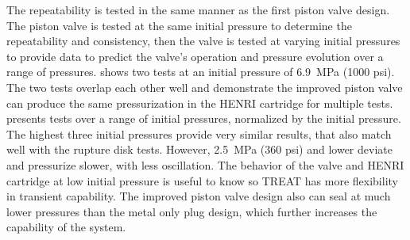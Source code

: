 The repeatability is tested in the same manner as the first piston valve design. The piston valve is tested at the same initial pressure to determine the repeatability and consistency, then the valve is tested at varying initial pressures to provide data to predict the valve's operation and pressure evolution over a range of pressures.  shows two tests at an initial pressure of \SI{6.9}{\mega\pascal} (1000 psi). The two tests overlap each other well and demonstrate the improved piston valve can produce the same pressurization in the HENRI cartridge for multiple tests.  presents tests over a range of initial pressures, normalized by the initial pressure. The highest three initial pressures provide very similar results, that also match well with the rupture disk tests. However, \SI{2.5}{\mega\pascal} (360 psi) and lower deviate and pressurize slower, with less oscillation. The behavior of the valve and HENRI cartridge at low initial pressure is useful to know so TREAT has more flexibility in transient capability. The improved piston valve design also can seal at much lower pressures than the metal only plug design, which further increases the capability of the system.











